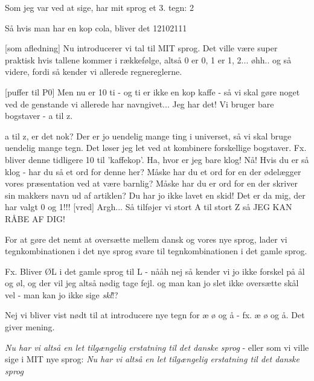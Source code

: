 \documentclass[a4paper,11pt]{article}
\begin{document}
\begin{sketch}
 Som jeg var ved at sige, har mit sprog et 3. tegn: 2


 Så hvis man har en kop cola, bliver det 12102111

[som afledning] Nu introducerer vi tal til MIT sprog. Det ville være super praktisk hvis tallene kommer i rækkefølge,
altså 0 er 0, 1 er 1, 2... øhh.. og så videre, fordi så kender vi allerede regnereglerne.


[puffer til P0] Men nu er 10 ti - og ti er ikke en kop kaffe - så vi skal gøre noget ved de genstande
   vi allerede har navngivet... Jeg har det! Vi bruger bare bogstaver - a til z.


 a til z, er det nok? Der er jo uendelig mange ting i universet, så vi skal bruge uendelig mange tegn.
 Det løser jeg let ved at kombinere forskellige bogstaver. Fx. bliver denne tidligere 10 til 'kaffekop'. Ha, hvor er jeg bare klog!
 Nå! Hvis du er så klog - har du så et ord for denne her? 
 Måske har du et ord for en der ødelægger vores præsentation ved at være barnlig?
 Måske har du er ord for en der skriver sin makkers navn ud af artiklen?
 Du har jo ikke lavet en skid!
 Det er da mig, der har valgt 0 og 1!!!
[vred] Argh... Så tilføjer vi stort A til stort Z så JEG KAN RÅBE AF DIG!

 For at gøre det nemt at oversætte mellem dansk og vores nye sprog, lader vi tegnkombinationen i det nye sprog
   svare til tegnkombinationen i det gamle sprog.

 Fx. Bliver ØL i det gamle sprog til L - nååh nej  så kender vi jo ikke forskel på ål og øl, og der vil jeg altså nødig tage fejl.
 og man kan jo slet ikke oversætte skål vel - man kan jo ikke sige \emph{skl}!?

 Nej vi bliver vist nødt til at introducere nye tegn for æ ø og å - fx. æ ø og å. Det giver mening.

 \emph{Nu har vi altså en let tilgængelig erstatning til det danske sprog} - eller som vi ville sige i MIT nye sprog: \emph{Nu har vi altså en let tilgængelig erstatning til det danske sprog}

\end{sketch}
\end{document}
